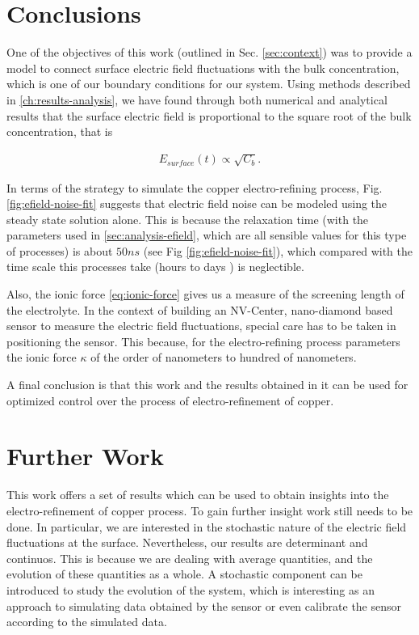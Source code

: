 \section{Conclusions}

One of the objectives of this work (outlined in Sec. \ref{sec:context}) was to provide a model to connect surface electric field fluctuations with the bulk concentration, which is one of our boundary conditions for our system. Using methods described in \ref{ch:results-analysis}, we have found through both numerical and analytical results that the surface electric field is proportional to the square root of the bulk concentration, that is

\begin{align}
	E_{surface}(t) \propto \sqrt{C_b}.
\end{align}

In terms of the strategy to simulate the copper electro-refining process, Fig. \ref{fig:efield-noise-fit} suggests that electric field noise can be modeled using the steady state solution alone. This is because the relaxation time (with the parameters used in \ref{sec:analysis-efield}, which are all sensible values for this type of processes) is about $50 ns$ (see Fig \ref{fig:efield-noise-fit}), which compared with the time scale this processes take (hours to days \cite{schlesinger}) is neglectible.

Also, the ionic force \ref{eq:ionic-force} gives us a measure of the screening length of the electrolyte. In the context of building an NV-Center, nano-diamond based sensor to measure the electric field fluctuations, special care has to be taken in positioning the sensor. This because, for the electro-refining process parameters the ionic force $\kappa$ of the order of nanometers to hundred of nanometers.

A final conclusion is that this work and the results obtained in it can be used for optimized control over the process of electro-refinement of copper.

\section{Further Work}

This work offers a set of results which can be used to obtain insights into the electro-refinement of copper process. To gain further insight work still needs to be done. In particular, we are interested in the stochastic nature of the electric field fluctuations at the surface. Nevertheless, our results are determinant and continuos. This is because we are dealing with average quantities, and the evolution of these quantities as a whole. A stochastic component can be introduced to study the evolution of the system, which is interesting as an approach to simulating data obtained by the sensor or even calibrate the sensor according to the simulated data. 

